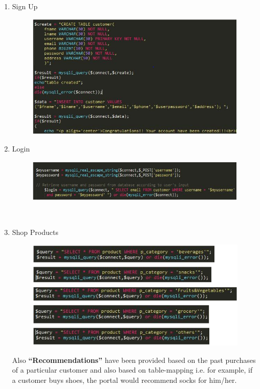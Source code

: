 \documentclass{tcc}
\begin{document}
\begin{enumerate}
    \item Sign Up
    \begin{figure}[H]
    \centering
    \includegraphics{images/6.PNG}\\
    \end{figure}
    \item Login
    \begin{figure}[H]
    \centering
    \includegraphics{images/7.PNG}\\
    \end{figure}
    \ \\
    \item Shop Products
    \begin{figure}[H]
    \centering
    \includegraphics{images/8.PNG}\\
    \end{figure}
    Also \textbf{“Recommendations”} have been provided based on the past purchases of a particular customer and also based on table-mapping i.e. for example, if a customer buys shoes, the portal would recommend socks for him/her.

\end{enumerate}
\end{document}
